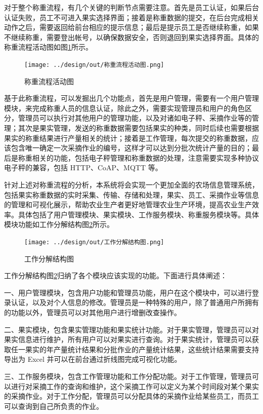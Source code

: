 \documentclass{xduugmr}
\begin{document}
对于整个称重流程，有几个关键的判断节点需要注意。首先是员工认证，如果后台认证失败，员工不可进入果实选择界面；接着是称重数据的提交，在后台完成相关动作之后，需要返回给前台相应的提示信息；最后是提示员工是否继续称重，如果不继续称重，需要登出帐号，以确保数据安全，否则退回到果实选择界面。具体的称重流程活动图如图\ref{fig:称重流程活动图}所示。

\begin{figure}[H]
    \centering
    \texttt{[image: ../design/out/称重流程活动图.png]}
    \caption{称重流程活动图}
    \label{fig:称重流程活动图}
\end{figure}

基于此称重流程，可以发掘出几个功能点，首先是用户管理，需要有一个用户管理模块，来完成称重人员的信息认证，除此之外，需要实现管理员和用户的角色区分，管理员可以执行对其他用户的管理功能，以及对诸如电子秤、采摘作业等的管理；其次是果实管理，发送的称重数据需要包括果实的种类，同时后续也需要根据果实的称重结果进行产量相关的统计；接着是工作管理，每次提交的称重数据，应该包含唯一确定一次采摘作业的编号，这样才可以达到分批次统计产量的目的；最后是称重相关的功能，包括电子秤管理和称重数据的处理，注意需要实现多种协议电子秤的兼容，包括 HTTP、CoAP、MQTT 等。

针对上述对称重流程的分析，本系统将会实现一个更加全面的农场信息管理系统，包括果实称重数据的实时采集、传输、存储和处理，果实、员工、采摘作业等信息的管理和可视化展示，帮助农业生产者更好地管理农业生产环境，提高农业生产效率。具体包括了用户管理模块、果实模块、工作服务模块、称重服务模块等。具体模块功能如工作分解结构图\ref{fig:工作分解结构图}所示。

\begin{figure}[H]
    \centering
    \texttt{[image: ../design/out/工作分解结构图.png]}
    \caption{工作分解结构图}
    \label{fig:工作分解结构图}
\end{figure}

工作分解结构图\ref{fig:工作分解结构图}归纳了各个模块应该实现的功能。下面进行具体阐述：

一、用户管理模块，包含用户功能和管理员功能，用户在这个模块中，可以进行登录认证，以及对个人信息的修改。管理员是一种特殊的用户，除了普通用户所拥有的功能以外，管理员可以对其他用户进行增删改查操作。

二、果实模块，包含果实管理功能和果实统计功能。对于果实管理，管理员可以对果实信息进行维护，所有用户可以对果实进行查询。对于果实统计，管理员可以获取任一果实的年产量统计结果和分批作业的产量统计结果，这些统计结果需要支持导出为 Excel 并可以在前台通过折线图完成可视化功能。

三、工作服务模块，包含工作管理功能和工作分配功能。对于工作管理，管理员可以进行对采摘工作的查询和维护，这个采摘工作可以定义为某个时间段对某个果实的采摘作业。对于工作分配，管理员可以分配具体的采摘作业给某些员工，而员工可以查询到自己所负责的作业。
\end{document}
